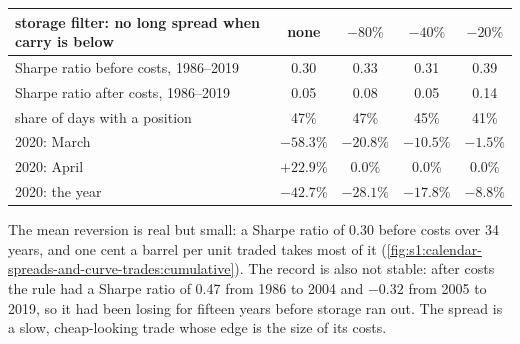 \begin{center}
\small
\begin{tabular}{@{}lcccc@{}}
\toprule
storage filter: no long spread when carry is below & none & $-80\%$ & $-40\%$ & $-20\%$\\
\midrule
Sharpe ratio before costs, 1986--2019 & 0.30 & 0.33 & 0.31 & 0.39\\
Sharpe ratio after costs, 1986--2019 & 0.05 & 0.08 & 0.05 & 0.14\\
share of days with a position & 47\% & 47\% & 45\% & 41\%\\
2020: March & $-58.3\%$ & $-20.8\%$ & $-10.5\%$ & $-1.5\%$\\
2020: April & $+22.9\%$ & 0.0\% & 0.0\% & 0.0\%\\
2020: the year & $-42.7\%$ & $-28.1\%$ & $-17.8\%$ & $-8.8\%$\\
\bottomrule
\end{tabular}
\end{center}

The mean reversion is real but small: a Sharpe ratio of 0.30 before costs over 34 years, and one cent a barrel per unit traded takes most of it
(\cref{fig:s1:calendar-spreads-and-curve-trades:cumulative}). The record is also not stable: after costs the rule had a Sharpe ratio of 0.47 from
1986 to 2004 and $-0.32$ from 2005 to 2019, so it had been losing for fifteen years before storage ran out. The spread is a slow, cheap-looking trade
whose edge is the size of its costs.

\begin{omfigure}

\label{fig:s1:calendar-spreads-and-curve-trades:cumulative}
\end{omfigure}

